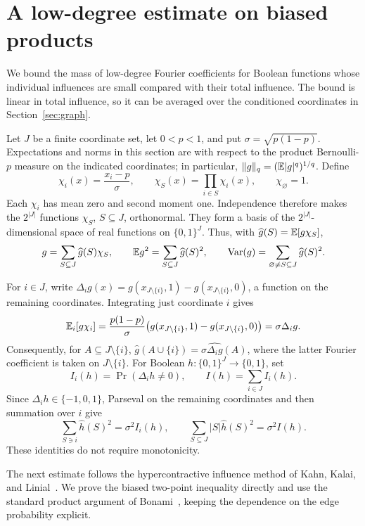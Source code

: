 \section{A low-degree estimate on biased products}\label{sec:fourier}

We bound the mass of low-degree Fourier coefficients for Boolean
functions whose individual influences are small compared with their
total influence. The bound is linear in total influence, so it can be
averaged over the conditioned coordinates in Section~\ref{sec:graph}.

Let $J$ be a finite coordinate set, let $0<p<1$, and put
$\sigma=\sqrt{p(1-p)}$. Expectations and norms in this section are with
respect to the product Bernoulli-$p$ measure on the indicated coordinates;
in particular, $\|g\|_q=(\mathbb E|g|^q)^{1/q}$. Define
\[
  \chi_i(x)=\frac{x_i-p}{\sigma},\qquad
  \chi_S(x)=\prod_{i\in S}\chi_i(x),\qquad \chi_\varnothing=1.
\]
Each $\chi_i$ has mean zero and second moment one. Independence therefore
makes the $2^{|J|}$ functions $\chi_S$, $S\subseteq J$, orthonormal.
They form a basis of the $2^{|J|}$-dimensional space of real functions on
$\{0,1\}^J$. Thus, with $\widehat g(S)=\mathbb E[g\chi_S]$,
\begin{equation}\label{eq:parseval}
  g=\sum_{S\subseteq J}\widehat g(S)\chi_S,\qquad
  \mathbb E g^2=\sum_{S\subseteq J}\widehat g(S)^2,\qquad
  \operatorname{Var}(g)=\sum_{\varnothing\ne S\subseteq J}\widehat g(S)^2.
\end{equation}

For $i\in J$, write
$\Delta_i g(x)=g(x_{J\setminus\{i\}},1)-g(x_{J\setminus\{i\}},0)$,
a function on the remaining coordinates. Integrating just coordinate $i$
gives
\[
  \mathbb E_i[g\chi_i]
  =\frac{p(1-p)}{\sigma}
    \bigl(g(x_{J\setminus\{i\}},1)-g(x_{J\setminus\{i\}},0)\bigr)
  =\sigma\Delta_i g.
\]
Consequently, for $A\subseteq J\setminus\{i\}$,
$\widehat g(A\cup\{i\})=\sigma\widehat{\Delta_i g}(A)$,
where the latter Fourier coefficient is taken on $J\setminus\{i\}$.
For Boolean $h:\{0,1\}^J\to\{0,1\}$, set
\[
  I_i(h)=\Pr(\Delta_i h\ne0),\qquad I(h)=\sum_{i\in J}I_i(h).
\]
Since $\Delta_i h\in\{-1,0,1\}$, Parseval on the remaining coordinates
and then summation over $i$ give
\begin{equation}\label{eq:dirichlet}
  \sum_{S\ni i}\widehat h(S)^2=\sigma^2 I_i(h),\qquad
  \sum_{S\subseteq J}|S|\widehat h(S)^2=\sigma^2 I(h).
\end{equation}
These identities do not require monotonicity.

The next estimate follows the hypercontractive influence method of
Kahn, Kalai, and Linial~\cite{KKL88}. We prove the biased two-point
inequality directly and use the standard product argument of
Bonami~\cite[Chapter~III, Lemma~1]{Bonami1970}, keeping the dependence
on the edge probability explicit.


